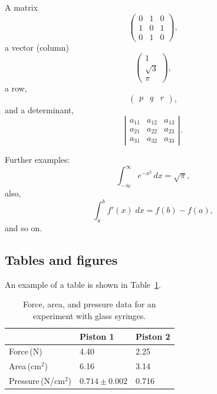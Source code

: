 \documentclass[twocolumn]{revtex4}
\begin{document}
\vspace*{0.5cm}
A matrix
\begin{equation}
\left(
\begin{array}{ccc}
0 & 1 & 0 \\
1 & 0 & 1 \\
0 & 1 & 0
\end{array}
\right),
\label{matrix1}
\end{equation}
a vector (column)
\begin{equation}
\left(
\begin{array}{c}
1 \\
\sqrt{3}\\
\pi
\end{array}
\right),
\label{hola}
\end{equation}
a row,
\begin{equation}
\left(
\begin{array}{ccc}
p & q & r
\end{array}
\right),
\label{eq:row}
\end{equation}
and a determinant,
\begin{equation}
\left|
\begin{array}{ccc}
a_{11} & a_{12} & a_{13} \\
a_{21} & a_{22} & a_{23} \\
a_{31} & a_{32} & a_{33}
\end{array}
\right|.
\label{determinant}
\end{equation}

\noindent
Further examples:
\begin{equation}
\int_{-\infty}^\infty e^{-x^2} \, dx= \sqrt{\pi},
\label{eq:fine}
\end{equation}
also,
\begin{equation}
\int_a^b f'(x) \; dx=f(b)-f(a),
\label{barrow}
\end{equation}
and so on.

\subsection{Tables and figures}

An example of a table is shown in Table~\ref{tab:sample1}.

\begin{table}[h!]
\centering
\caption{Force, area, and pressure data for an experiment with glass syringes.}
\label{tab:sample1}
\vspace*{2mm}
\begin{tabular}{|l|l|l|}
\hline
& Piston 1 & Piston 2 \\
\hline
Force\,(N) & 4.40 & 2.25 \\
Area\,(cm$^2$) & 6.16 & 3.14 \\
Pressure\,(N/cm$^2$) & $0.714 \pm 0.002$ & 0.716 \\
\hline
\end{tabular}
\end{table}
\end{document}
